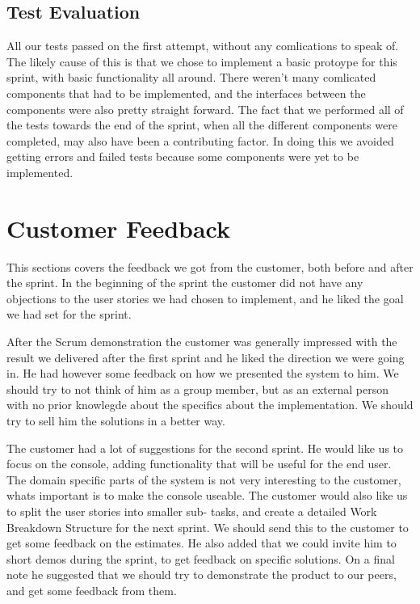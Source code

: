 \subsection{Test Evaluation}
All our tests passed on the first attempt, without any comlications to speak of. The likely cause of this is that we chose to implement a basic protoype for this sprint, with basic functionality all around. There weren't many comlicated components that had to be implemented, and the interfaces between the components were also pretty straight forward. The fact that we performed all of the tests towards the end of the sprint, when all the different components were completed, may also have been a contributing factor. In doing this we avoided getting errors and failed tests because some components were yet to be implemented.

\section{Customer Feedback}
This sections covers the feedback we got from the customer, both before and after the sprint.
\newline
\newline
In the beginning of the sprint the customer did not have any objections to the user stories we had chosen to implement, and he liked the goal we had set for the sprint.

After the Scrum demonstration the customer was generally impressed with the result we delivered after the first sprint and he liked the direction we were going in. He had however some feedback on how we presented the system to him. We should try to not think of him as a group member, but as an external person with no prior knowlegde about the specifics about the implementation. We should try to sell him the solutions in a better way.

The customer had a lot of suggestions for the second sprint. He would like us to focus on the console, adding functionality that will be useful for the end user. The domain specific parts of the system is not very interesting to the customer, whats important is to make the console useable. The customer would also like us to split the user stories into smaller sub- tasks, and create a detailed Work Breakdown Structure for the next sprint. We should send this to the customer to get some feedback on the estimates. He also added that we could invite him to short demos during the sprint, to get feedback on specific solutions. On a final note he suggested that we should try to demonstrate the product to our peers, and get some feedback from them.


